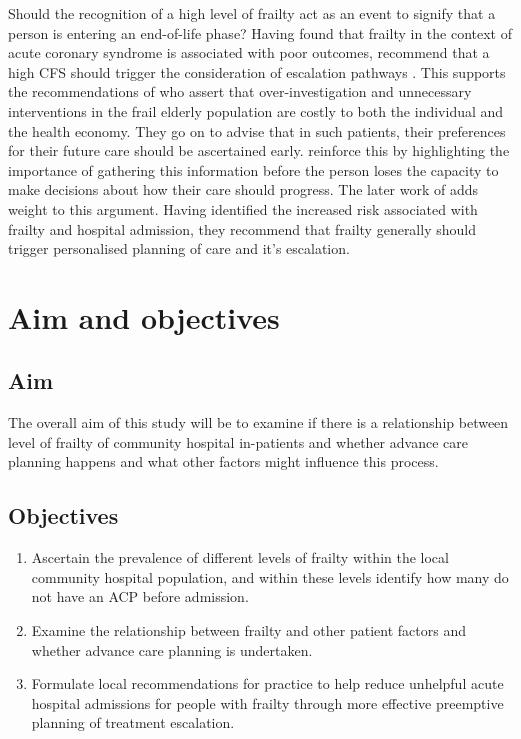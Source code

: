 \documentclass
[
	12pt,
	a4paper,
	oneside,
]{article}
\begin{document}
Should the recognition of a high level of frailty act as an event to signify
that a person is entering an end-of-life phase? Having found that frailty in the 
context of acute coronary syndrome is associated
with poor outcomes, \textcite{kang:15} recommend that a high CFS should
trigger the consideration of escalation pathways \parencite{kang:15}.
This supports the recommendations of \textcite{silver:12} who assert that over-investigation
and unnecessary interventions in the frail elderly population are costly to both the
individual and the health economy. They go on to advise that in such patients, 
their preferences for their future care should be ascertained early. \textcite{oliver:14} 
reinforce this by highlighting the importance of gathering this information
before the person loses the capacity to make decisions about how their care should
progress. The later work of \textcite{romero-ortuno:16} adds weight to this argument.
Having identified the increased risk associated with frailty and hospital admission, 
they recommend that frailty generally should trigger personalised planning of
care and it's escalation.

\section{Aim and objectives}

\subsection{Aim}
The overall aim of this study will be to examine if there is a relationship between
level of frailty of community hospital in-patients and whether advance care planning
happens and what other factors might influence this process.

\subsection{Objectives}

\begin{enumerate}
\item	Ascertain the prevalence of different levels of frailty within the local community
		hospital population, and within these levels identify how many do not have
		an ACP before admission.\label{obj:prevalence}
\item	Examine the relationship between frailty and other patient factors and
		whether advance care planning is undertaken.\label{obj:association}
\item	Formulate local recommendations for practice to help reduce unhelpful
		acute hospital admissions for people with frailty through more effective
		preemptive planning of treatment escalation.
\end{enumerate}
\end{document}
